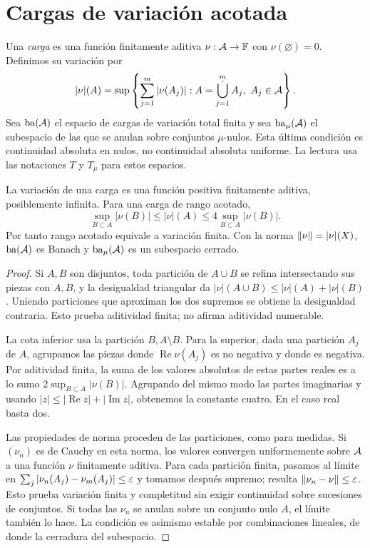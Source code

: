 \section{Cargas de variación acotada}\label{lectura:v2-29}
\begin{definicion}
Una \emph{carga} es una función finitamente aditiva $\nu:\mathcal A\to\mathbb F$ con $\nu(\varnothing)=0$. Definimos su variación por
\[
 |\nu|(A)=\sup\left\{\sum_{j=1}^m|\nu(A_j)|:A=\mathop{\dot\bigcup}_{j=1}^mA_j,\ A_j\in\Acal\right\}.
\]
Sea $\operatorname{ba}(\mathcal A)$ el espacio de cargas de variación total finita y sea $\operatorname{ba}_\mu(\mathcal A)$ el subespacio de las que se anulan sobre conjuntos $\mu$-nulos. Esta última condición es continuidad absoluta en nulos, no continuidad absoluta uniforme. La lectura usa las notaciones $T$ y $T_\mu$ para estos espacios.
\end{definicion}
\begin{proposicion}\label{v2:ba-banach}
La variación de una carga es una función positiva finitamente aditiva, posiblemente infinita. Para una carga de rango acotado,
\[
 \sup_{B\subset A}|\nu(B)|\le|\nu|(A)\le4\sup_{B\subset A}|\nu(B)|.
\]
Por tanto rango acotado equivale a variación finita. Con la norma $\left\lVert\nu\right\rVert=|\nu|(X)$, $\operatorname{ba}(\mathcal A)$ es Banach y $\operatorname{ba}_\mu(\mathcal A)$ es un subespacio cerrado.
\end{proposicion}
\begin{proof}
Si $A,B$ son disjuntos, toda partición de $A\cup B$ se refina intersectando sus piezas con $A,B$, y la desigualdad triangular da $|\nu|(A\cup B)\le|\nu|(A)+|\nu|(B)$. Uniendo particiones que aproximan los dos supremos se obtiene la desigualdad contraria. Esto prueba aditividad finita; no afirma aditividad numerable.

La cota inferior usa la partición $B,A\setminus B$. Para la superior, dada una partición $A_j$ de $A$, agrupamos las piezas donde $\operatorname{Re}\nu(A_j)$ es no negativa y donde es negativa. Por aditividad finita, la suma de los valores absolutos de estas partes reales es a lo sumo $2\sup_{B\subset A}|\nu(B)|$. Agrupando del mismo modo las partes imaginarias y usando $|z|\le|\operatorname{Re}z|+|\operatorname{Im}z|$, obtenemos la constante cuatro. En el caso real basta dos.

Las propiedades de norma proceden de las particiones, como para medidas. Si $(\nu_n)$ es de Cauchy en esta norma, los valores convergen uniformemente sobre $\mathcal A$ a una función $\nu$ finitamente aditiva. Para cada partición finita, pasamos al límite en $\sum_j|\nu_n(A_j)-\nu_m(A_j)|\le\varepsilon$ y tomamos después supremo; resulta $\left\lVert\nu_n-\nu\right\rVert\le\varepsilon$. Esto prueba variación finita y completitud sin exigir continuidad sobre sucesiones de conjuntos. Si todas las $\nu_n$ se anulan sobre un conjunto nulo $A$, el límite también lo hace. La condición es asimismo estable por combinaciones lineales, de donde la cerradura del subespacio.
\end{proof}

